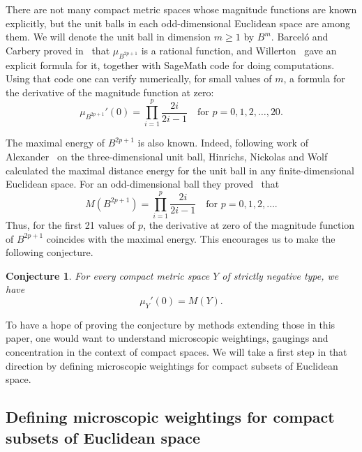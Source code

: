 \documentclass[a4paper, oneside, reqno]{amsart}
\newtheorem{conj}[theorem]{Conjecture}
\theoremstyle{definition}
\theoremstyle{remark}
\numberwithin{equation}{section}
\begin{document}
There are not many compact metric spaces whose magnitude functions are known explicitly, but the unit balls in each odd-dimensional Euclidean space are among them. We will denote the unit ball in dimension \(m \geq 1\) by \(B^m\). Barcel\'o and Carbery proved in~\cite[Theorem~4]{BarceloCarbery:magnitude-of-compact-sets} that \(\mu_{B^{2p+1}}\) is a rational function, and Willerton~\cite{Willerton:odd-balls} gave an explicit formula for it, together with SageMath code for doing computations. Using that code one can verify numerically, for small values of \(m\), a formula for the derivative of the magnitude function at zero:
\[
    \mu_{B^{2p+1}}'(0) 
    = 
    \prod_{i=1}^{p}\frac{2i}{2i-1}
    \quad
    \text{for }
    p = 0, 1, 2,  \dots, 20.
\]

The maximal energy of \(B^{2p+1}\) is also known. Indeed, following work of Alexander~\cite{Alexander:two-problems} on the three-dimensional unit ball, Hinrichs, Nickolas and Wolf calculated the maximal distance energy for the unit ball in any finite-dimensional Euclidean space. For an odd-dimensional ball they proved~\cite[Theorem~2.1]{HinrichsNickolasWolf:metric-geometry-of-unit-ball} that
\[
    M(B^{2p+1}) = \prod_{i=1}^{p}\frac{2i}{2i-1}
    \quad
    \text{for }
    p = 0, 1, 2, \dots.
\] 
Thus, for the first 21 values of \(p\), the derivative at zero of the magnitude function of \(B^{2p+1}\) coincides with the maximal energy. This encourages us to make the following conjecture.

\begin{conj}
    For every compact metric space \(Y\) of strictly negative type, we have
    \[
        \mu_Y'(0)
        =
        M(Y).
    \]
\end{conj}

To have a hope of proving the conjecture by methods extending those in this paper, one would want to understand microscopic weightings, gaugings and concentration in the context of compact spaces. We will take a first step in that direction by defining microscopic weightings for compact subsets of Euclidean space.


\subsection{Defining microscopic weightings for compact subsets of Euclidean space}
\label{sec:microwtg-infinite}
\end{document}

